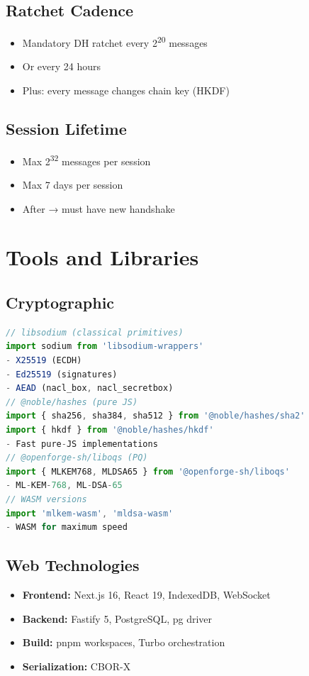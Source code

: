 \documentclass[11pt,a4paper,oneside]{book}
\begin{document}
\vspace{-0.2cm}\subsection{Ratchet Cadence}
\begin{itemize}
  \item Mandatory DH ratchet every 2\textsuperscript{20} messages
  \item Or every 24 hours
  \item Plus: every message changes chain key (HKDF)
\end{itemize}
\vspace{-0.2cm}\subsection{Session Lifetime}
\begin{itemize}
  \item Max 2\textsuperscript{32} messages per session
  \item Max 7 days per session
  \item After → must have new handshake
\end{itemize}
\vspace{-0.3cm}\section{Tools and Libraries}
\vspace{-0.2cm}\subsection{Cryptographic}
\begin{lstlisting}[language=TypeScript]
// libsodium (classical primitives)
import sodium from 'libsodium-wrappers'
- X25519 (ECDH)
- Ed25519 (signatures)
- AEAD (nacl_box, nacl_secretbox)
// @noble/hashes (pure JS)
import { sha256, sha384, sha512 } from '@noble/hashes/sha2'
import { hkdf } from '@noble/hashes/hkdf'
- Fast pure-JS implementations
// @openforge-sh/liboqs (PQ)
import { MLKEM768, MLDSA65 } from '@openforge-sh/liboqs'
- ML-KEM-768, ML-DSA-65
// WASM versions
import 'mlkem-wasm', 'mldsa-wasm'
- WASM for maximum speed
\end{lstlisting}
\vspace{-0.2cm}\subsection{Web Technologies}
\begin{itemize}
  \item \textbf{Frontend:} Next.js 16, React 19, IndexedDB, WebSocket
  \item \textbf{Backend:} Fastify 5, PostgreSQL, pg driver
  \item \textbf{Build:} pnpm workspaces, Turbo orchestration
  \item \textbf{Serialization:} CBOR-X
\end{itemize}
\end{document}
